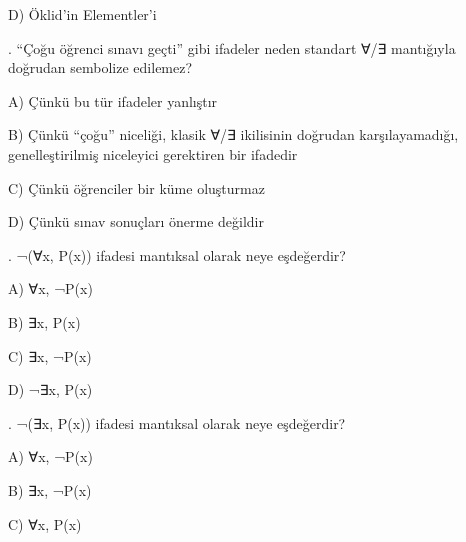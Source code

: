 \par\noindent\hspace*{1.6em}D) Öklid’in Elementler’i

\par\smallskip{}. “Çoğu öğrenci sınavı geçti” gibi ifadeler neden standart ∀/∃ mantığıyla doğrudan sembolize edilemez?

\par\noindent\hspace*{1.6em}A) Çünkü bu tür ifadeler yanlıştır

\par\noindent\hspace*{1.6em}B) Çünkü “çoğu” niceliği, klasik ∀/∃ ikilisinin doğrudan karşılayamadığı, genelleştirilmiş niceleyici gerektiren bir ifadedir

\par\noindent\hspace*{1.6em}C) Çünkü öğrenciler bir küme oluşturmaz

\par\noindent\hspace*{1.6em}D) Çünkü sınav sonuçları önerme değildir

\par\smallskip{}. ¬(∀x, P(x)) ifadesi mantıksal olarak neye eşdeğerdir?

\par\noindent\hspace*{1.6em}A) ∀x, ¬P(x)

\par\noindent\hspace*{1.6em}B) ∃x, P(x)

\par\noindent\hspace*{1.6em}C) ∃x, ¬P(x)

\par\noindent\hspace*{1.6em}D) ¬∃x, P(x)

\par\smallskip{}. ¬(∃x, P(x)) ifadesi mantıksal olarak neye eşdeğerdir?

\par\noindent\hspace*{1.6em}A) ∀x, ¬P(x)

\par\noindent\hspace*{1.6em}B) ∃x, ¬P(x)

\par\noindent\hspace*{1.6em}C) ∀x, P(x)

